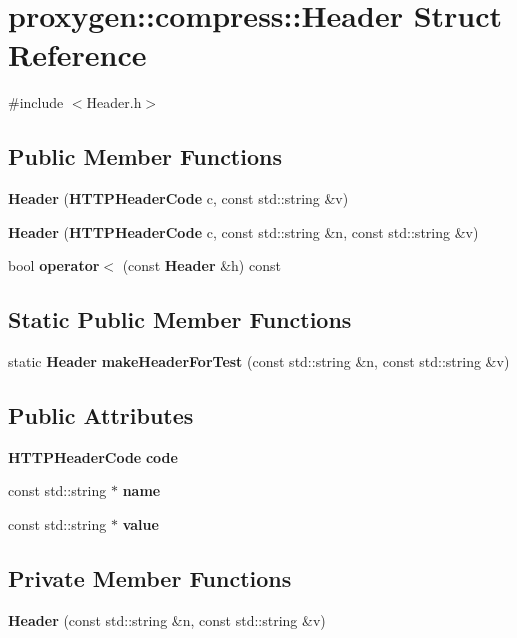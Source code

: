 \section{proxygen\+:\+:compress\+:\+:Header Struct Reference}
\label{structproxygen_1_1compress_1_1Header}


{\ttfamily \#include $<$Header.\+h$>$}

\subsection*{Public Member Functions}
\begin{DoxyCompactItemize}
\item 
{\bf Header} ({\bf H\+T\+T\+P\+Header\+Code} c, const std\+::string \&v)
\item 
{\bf Header} ({\bf H\+T\+T\+P\+Header\+Code} c, const std\+::string \&n, const std\+::string \&v)
\item 
bool {\bf operator$<$} (const {\bf Header} \&h) const 
\end{DoxyCompactItemize}
\subsection*{Static Public Member Functions}
\begin{DoxyCompactItemize}
\item 
static {\bf Header} {\bf make\+Header\+For\+Test} (const std\+::string \&n, const std\+::string \&v)
\end{DoxyCompactItemize}
\subsection*{Public Attributes}
\begin{DoxyCompactItemize}
\item 
{\bf H\+T\+T\+P\+Header\+Code} {\bf code}
\item 
const std\+::string $\ast$ {\bf name}
\item 
const std\+::string $\ast$ {\bf value}
\end{DoxyCompactItemize}
\subsection*{Private Member Functions}
\begin{DoxyCompactItemize}
\item 
{\bf Header} (const std\+::string \&n, const std\+::string \&v)
\end{DoxyCompactItemize}



